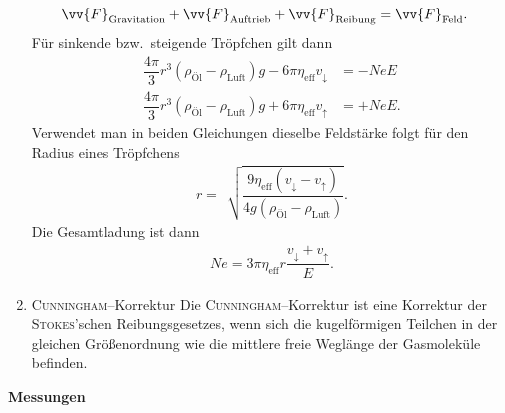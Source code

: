 \begin{enumerate}[label=--]
\begin{align}
                        \vv{F}_\text{Gravitation}+\vv{F}_\text{Auftrieb}+\vv{F}_\text{Reibung}&=\vv{F}_\text{Feld}
                .\end{align} 
                Für sinkende bzw.\ steigende Tröpfchen gilt dann
                \begin{align} 
                        \dfrac{4\pi }{3}r^3\left(\rho _\text{Öl}-\rho _\text{Luft}\right)g-6\pi \eta_\text{eff}v_\downarrow&=-NeE\\
                        \dfrac{4\pi }{3}r^3\left(\rho _\text{Öl}-\rho _\text{Luft}\right)g+6\pi \eta_\text{eff}v_\uparrow&=+NeE
                .\end{align} 
                Verwendet man in beiden Gleichungen dieselbe Feldstärke folgt für den Radius eines Tröpfchens
                \begin{align} 
                        r=\,\sqrt[]{\dfrac{9 \eta_\text{eff}\left(v_\downarrow-v_\uparrow\right)}{4g\left(\rho _\text{Öl}-\rho _\text{Luft}\right)}}
                .\end{align} 
                Die Gesamtladung ist dann
                \begin{align} 
                        Ne=3\pi \eta_\text{eff}r\dfrac{v_\downarrow+v_\uparrow}{E}
                .\end{align} 
        \item \textsc{Cunningham}--Korrektur \hspace{25pt}
                Die \textsc{Cunningham}--Korrektur ist eine Korrektur der \textsc{Stokes}'schen Reibungsgesetzes, wenn sich die kugelförmigen Teilchen in der gleichen Größenordnung wie die mittlere freie Weglänge der Gasmoleküle befinden.
\end{enumerate}
\textbf{Messungen} 

